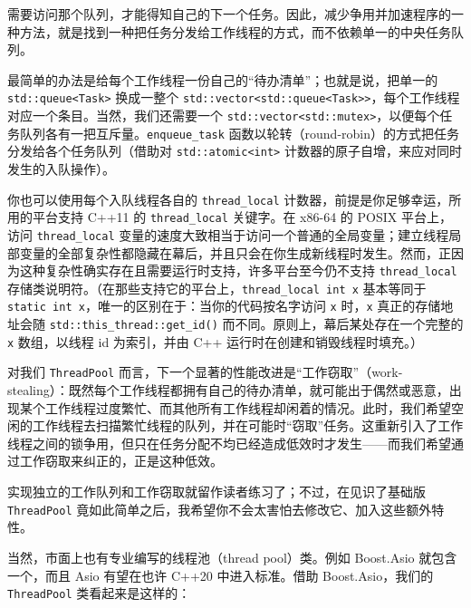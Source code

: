 需要访问那个队列，才能得知自己的下一个任务。因此，减少争用并加速程序的一种方法，就是找到一种把任务分发给工作线程的方式，而不依赖单一的中央任务队列。

最简单的办法是给每个工作线程一份自己的“待办清单”；也就是说，把单一的 \texttt{std::\allowbreak{}queue<\allowbreak{}Task>\allowbreak{}} 换成一整个 \texttt{std::\allowbreak{}vector<\allowbreak{}std::\allowbreak{}queue<\allowbreak{}Task>\allowbreak{}>}，每个工作线程对应一个条目。当然，我们还需要一个 \texttt{std::\allowbreak{}vector<\allowbreak{}std::\allowbreak{}mutex>\allowbreak{}}，以便每个任务队列各有一把互斥量。\texttt{enqueue\_\allowbreak{}task} 函数以轮转（round-robin）的方式把任务分发给各个任务队列（借助对 \texttt{std::\allowbreak{}atomic<\allowbreak{}int>\allowbreak{}} 计数器的原子自增，来应对同时发生的入队操作）。

你也可以使用每个入队线程各自的 \texttt{thread\_\allowbreak{}local} 计数器，前提是你足够幸运，所用的平台支持 C++11 的 \texttt{thread\_\allowbreak{}local} 关键字。在 x86-64 的 POSIX 平台上，访问 \texttt{thread\_\allowbreak{}local} 变量的速度大致相当于访问一个普通的全局变量；建立线程局部变量的全部复杂性都隐藏在幕后，并且只会在你生成新线程时发生。然而，正因为这种复杂性确实存在且需要运行时支持，许多平台至今仍不支持 \texttt{thread\_\allowbreak{}local} 存储类说明符。（在那些支持它的平台上，\texttt{thread\_\allowbreak{}local int x} 基本等同于 \texttt{static int x}，唯一的区别在于：当你的代码按名字访问 \texttt{x} 时，\texttt{x} 真正的存储地址会随 \texttt{std::\allowbreak{}this\_\allowbreak{}thread::\allowbreak{}get\_\allowbreak{}id(\allowbreak{})\allowbreak{}} 而不同。原则上，幕后某处存在一个完整的 \texttt{x} 数组，以线程 id 为索引，并由 C++ 运行时在创建和销毁线程时填充。）

对我们 \texttt{Thread\allowbreak{}Pool} 而言，下一个显著的性能改进是“工作窃取”（work-stealing）：既然每个工作线程都拥有自己的待办清单，就可能出于偶然或恶意，出现某个工作线程过度繁忙、而其他所有工作线程却闲着的情况。此时，我们希望空闲的工作线程去扫描繁忙线程的队列，并在可能时“窃取”任务。这重新引入了工作线程之间的锁争用，但只在任务分配不均已经造成低效时才发生——而我们希望通过工作窃取来纠正的，正是这种低效。

实现独立的工作队列和工作窃取就留作读者练习了；不过，在见识了基础版 \texttt{Thread\allowbreak{}Pool} 竟如此简单之后，我希望你不会太害怕去修改它、加入这些额外特性。

当然，市面上也有专业编写的线程池（thread pool）类。例如 Boost.Asio 就包含一个，而且 Asio 有望在也许 C++20 中进入标准。借助 Boost.Asio，我们的 \texttt{Thread\allowbreak{}Pool} 类看起来是这样的：

